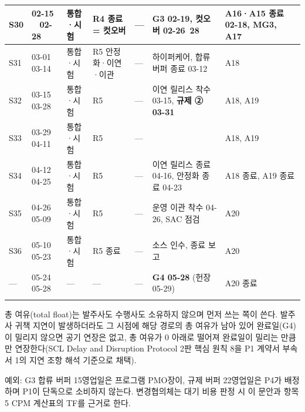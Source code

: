 \documentclass[10pt,a4paper]{article}
\begin{document}
{\begin{longtable}{|C{9mm}|L{24mm}|L{16mm}|L{44mm}|L{40mm}|L{76mm}|L{40mm}|}
S30 & 02-15 ~ 02-28 & 통합·시험 & R4 종료 = 컷오버 & — & \textbf{G3 02-19}, \textbf{컷오버 02-26~28} & A16·A15 종료 02-18, MG3, A17 \\ \hline
S31 & 03-01 ~ 03-14 & 통합·시험 & R5 안정화·이연·이관 & — & 하이퍼케어, 합류 버퍼 종료 03-12 & A18 \\ \hline
S32 & 03-15 ~ 03-28 & 통합·시험 & R5 & — & 이연 릴리스 착수 03-15, \textbf{규제 ② 03-31} & A18, A19 \\ \hline
S33 & 03-29 ~ 04-11 & 통합·시험 & R5 & — & & A18, A19 \\ \hline
S34 & 04-12 ~ 04-25 & 통합·시험 & R5 & — & 이연 릴리스 종료 04-16, 안정화 종료 04-23 & A18 종료, A19 종료 \\ \hline
S35 & 04-26 ~ 05-09 & 통합·시험 & R5 & — & 운영 이관 착수 04-26, SAC 점검 & A20 \\ \hline
S36 & 05-10 ~ 05-23 & 통합·시험 & R5 종료 & — & 소스 인수, 종료 보고 & A20 \\ \hline
— & 05-24 ~ 05-28 & — & — & — & \textbf{G4 05-28} (헌장 05-29) & A20 종료 \\ \hline
\fi
\end{longtable}}
\landscapeoff

\begin{fieldbox}
\ifwbblank
{}
\par
\else
총 여유(total float)는 발주사도 수행사도 소유하지 않으며 먼저 쓰는 쪽이 쓴다. 발주사 귀책 지연이 발생하더라도 그 시점에 해당 경로의 총 여유가 남아 있어 완료일(G4)이 밀리지 않으면 공기 연장은 없고, 총 여유가 0 아래로 떨어져 완료일이 밀리는 만큼만 연장한다(SCL Delay and Disruption Protocol 2판 핵심 원칙 8을 P1 계약서 부속서 1의 지연 조항 해석 기준으로 채택).

예외: G3 합류 버퍼 15영업일은 프로그램 PMO장이, 규제 버퍼 22영업일은 P4가 배정하며 P1이 단독으로 소비하지 않는다. 변경협의체는 대기 비용 판정 시 이 문안과 항목 5 CPM 계산표의 TF를 근거로 한다.
\fi
\end{fieldbox}
\end{document}
